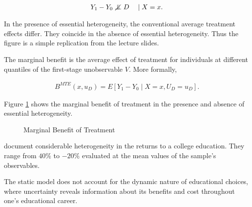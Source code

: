 \begin{boenumerate}
\begin{align*}
    Y_1 - Y_0 \notindep D\quad \mid X = x.
\end{align*}

In the presence of essential heterogeneity, the conventional average treatment effects differ. They coincide in the absence of essential heterogeneity. Thus the figure is a simple replication from the lecture slides.

\item The marginal benefit is the average effect of treatment for individuals at different quantiles of the first-stage unobservable $V$. More formally,

\begin{align*}
    B^{MTE}(x, u_D) = E [Y_1 - Y_0 \mid X = x,  U_D = u_D].
\end{align*}

Figure \ref{Marginal Benefit of Treatment} shows the marginal benefit of treatment in the presence and absence of essential heterogeneity.

\begin{figure}[h]\centering
\caption{Marginal Benefit of Treatment}\label{Marginal Benefit of Treatment}
\end{figure}

\item \cite{Carneiro.2011} document considerable heterogeneity in the returns to a college education. They range from $40\%$ to $-20\%$ evaluated at the mean values of the sample's observables.

\item The static model does not account for the dynamic nature of educational choices, where uncertainty reveals information about its benefits and cost throughout one's educational career.
\end{boenumerate}

